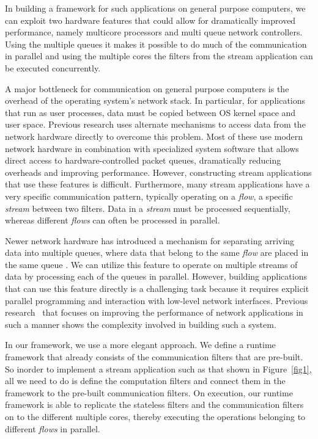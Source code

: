 \documentclass[10pt, conference, compsocconf, reqno]{IEEEtran}
\newcommand{\comment}[1]{}
\begin{document}
In building a framework for such applications on general purpose computers, we can exploit two hardware features that could allow for dramatically improved performance, namely multicore processors and multi queue network controllers. Using the multiple queues it makes it possible to do much of the communication in parallel and using the multiple cores the filters from the stream application can be executed concurrently.

A major bottleneck for communication on general purpose computers is the overhead of the operating system's network stack. In particular, for applications that run as user processes, data must be copied between OS kernel space and user space. Previous research uses alternate mechanisms to access data from the network hardware directly to overcome this problem\cite{Dobrescu09routebricks:exploiting}\cite{Han:2010:PGS:1851275.1851207}\cite{Kohler2000}. Most of these use modern network hardware in combination with specialized system software that allows direct access to hardware-controlled packet queues, dramatically reducing overheads and improving performance. However, constructing stream applications that use these features is difficult. Furthermore, many stream applications have a very specific communication pattern, typically operating on a \textit{flow}, a specific \textit{stream} between two filters. Data in a \textit{stream} must be processed sequentially, whereas different \textit{flows} can often be processed in parallel.

Newer network hardware has introduced a mechanism for separating arriving data into multiple queues, where data that belong to the same \textit{flow} are\comment{ guaranteed to be} placed in the same queue\cite{micro2008} \cite{intel2010}. We can utilize this feature to operate on multiple streams of data by processing each of the queues in parallel. However, building applications that can use this feature directly is a challenging task because it requires explicit parallel programming and interaction with low-level network interfaces. Previous research~\cite{Dobrescu09routebricks:exploiting,Han:2010:PGS:1851275.1851207} that focuses on improving the performance of network applications in such a manner shows the complexity involved in building such a system.

\comment{We parallelize both the application and packet operations to gain significant improvement in performance.}

In our framework, we use a more elegant approach. We define a runtime framework that already consists of the communication filters that are pre-built. So inorder to implement a stream application such as that shown in Figure~\ref{fig1}, all we need to do is define the computation filters and connect them in the framework to the pre-built communication filters. On execution, our runtime framework is able to replicate the stateless filters and the communication filters on to the different multiple cores, thereby executing the operations belonging to different \textit{flows} in parallel.
\end{document}
